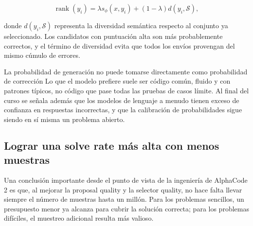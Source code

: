 $$
\operatorname{rank}(y_i)=
\lambda s_\phi(x,y_i)+(1-\lambda)d(y_i,\mathcal S),
$$

donde $d(y_i,\mathcal S)$ representa la diversidad semántica respecto al conjunto ya seleccionado. Los candidatos con puntuación alta son más probablemente correctos, y el término de diversidad evita que todos los envíos provengan del mismo cúmulo de errores.

\begin{warningbox}{La probabilidad de generación no puede tomarse directamente como probabilidad de corrección}
Lo que el modelo prefiere suele ser código común, fluido y con patrones típicos, no código que pase todas las pruebas de casos límite. Al final del curso se señala además que los modelos de lenguaje a menudo tienen exceso de confianza en respuestas incorrectas, y que la calibración de probabilidades sigue siendo en sí misma un problema abierto.
\end{warningbox}


\subsection{Lograr una solve rate más alta con menos muestras}


Una conclusión importante desde el punto de vista de la ingeniería de AlphaCode 2 es que, al mejorar la proposal quality y la selector quality, no hace falta llevar siempre el número de muestras hasta un millón. Para los problemas sencillos, un presupuesto menor ya alcanza para cubrir la solución correcta; para los problemas difíciles, el muestreo adicional resulta más valioso.



